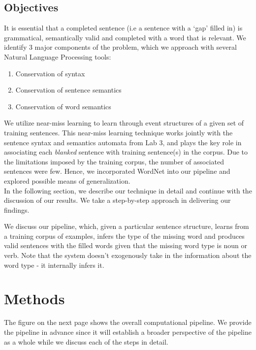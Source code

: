 \documentclass{article}[12pt]
\theoremstyle{definition}
\begin{document}
\subsection{Objectives} 

It is essential that a completed sentence (i.e a sentence with a `gap' filled in) is grammatical, semantically valid and completed with a word that is relevant. We identify 3 major components of the problem, which we approach with several Natural Language Processing tools: 

\begin{enumerate}
\item Conservation of syntax 
\item Conservation of sentence semantics 
\item Conservation of word semantics 
\end{enumerate}

We utilize near-miss learning to learn through event structures of a given set of training sentences. This near-miss learning technique works jointly with the sentence syntax and semantics automata from Lab 3, and plays the key role in associating each \emph{blanked} sentence with training sentence(s) in the corpus. Due to the limitations imposed by the training corpus, the number of associated sentences were few. Hence, we incorporated WordNet into our pipeline and explored possible means of generalization. \\

In the following section, we describe our technique in detail and continue with the discussion of our results. We take a step-by-step approach in delivering our findings. 

We discuss our pipeline, which, given a particular sentence structure, learns from a training corpus of examples, infers the type of the missing word and produces valid sentences with the filled words given that the missing word type is noun or verb. Note that the system doesn't exogenously take in the information about the word type - it internally infers it. 


\section{Methods}

The figure on the next page shows the overall computational pipeline. We provide the pipeline in advance since it will establish a broader perspective of the pipeline as a whole while we discuss each of the steps in detail. 
\end{document}

